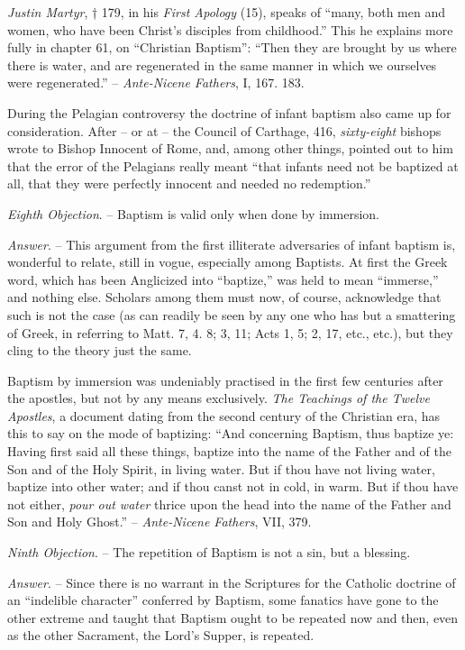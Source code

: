 \documentclass[
]{book}
\begin{document}
\emph{Justin Martyr}, † 179, in his \emph{First Apology} (15), speaks of ``many, both men and women, who have been Christ's disciples from childhood.'' This he explains more fully in chapter 61, on ``Christian Baptism'': ``Then they are brought by us where there is water, and are regenerated in the same manner in which we ourselves were regenerated.'' -- \emph{Ante-Nicene Fathers}, I, 167. 183.

During the Pelagian controversy the doctrine of infant baptism also came up for consideration. After -- or at -- the Council of Carthage, 416, \emph{sixty-eight} bishops wrote to Bishop Innocent of Rome, and, among other things, pointed out to him that the error of the Pelagians really meant ``that infants need not be baptized at all, that they were perfectly innocent and needed no redemption.''

\emph{Eighth Objection}. -- Baptism is valid only when done by immersion.

\emph{Answer}. -- This argument from the first illiterate adversaries of infant baptism is, wonderful to relate, still in vogue, especially among Baptists. At first the Greek word, which has been Anglicized into ``baptize,'' was held to mean ``immerse,'' and nothing else. Scholars among them must now, of course, acknowledge that such is not the case (as can readily be seen by any one who has but a smattering of Greek, in referring to Matt. 7, 4. 8; 3, 11; Acts 1, 5; 2, 17, etc., etc.), but they cling to the theory just the same.

Baptism by immersion was undeniably practised in the first few centuries after the apostles, but not by any means exclusively. \emph{The Teachings of the Twelve Apostles}, a document dating from the second century of the Christian era, has this to say on the mode of baptizing: ``And concerning Baptism, thus baptize ye: Having first said all these things, baptize into the name of the Father and of the Son and of the Holy Spirit, in living water. But if thou have not living water, baptize into other water; and if thou canst not in cold, in warm. But if thou have not either, \emph{pour out water} thrice upon the head into the name of the Father and Son and Holy Ghost.'' -- \emph{Ante-Nicene Fathers}, VII, 379.

\emph{Ninth Objection}. -- The repetition of Baptism is not a sin, but a blessing.

\emph{Answer}. -- Since there is no warrant in the Scriptures for the Catholic doctrine of an ``indelible character'' conferred by Baptism, some fanatics have gone to the other extreme and taught that Baptism ought to be repeated now and then, even as the other Sacrament, the Lord's Supper, is repeated.
\end{document}
